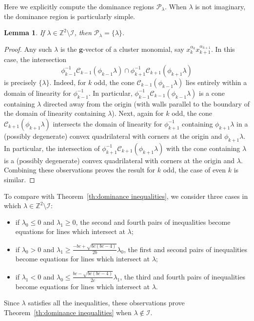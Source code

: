 \documentclass[pdflatex,sn-mathphys]{sn-jnl}%
\theoremstyle{thmstyleone}%
\newtheorem{lemma}[theorem]{Lemma}
\theoremstyle{thmstyletwo}%
\theoremstyle{thmstylethree}%
\newcommand{\bfg}{\boldsymbol{g}}
\newcommand{\cC}{\mathcal{C}}
\newcommand{\cI}{\mathcal{I}}
\newcommand{\cP}{\mathcal{P}}
\newcommand{\ZZ}{\mathbb{Z}}
\begin{document}
  Here we explicitly compute the dominance regions $\cP_\lambda$.
  When $\lambda$ is not imaginary, the dominance region is particularly simple.
  \begin{lemma}
    \label{le:cluster monomials}
    If $\lambda\in\ZZ^2\setminus\cI$, then $\cP_\lambda=\{\lambda\}$.
  \end{lemma}
  \begin{proof}
    Any such $\lambda$ is the $\bfg$-vector of a cluster monomial, say $x_k^{\alpha_k}x_{k+1}^{\alpha_{k+1}}$.
    In this case, the intersection
    \[\phi_{k-1}^{-1}\cC_{k-1}(\phi_{k-1}\lambda) \cap \phi_{k+1}^{-1}\cC_{k+1}(\phi_{k+1}\lambda)\]
    is precisely $\{\lambda\}$. 
    Indeed, for $k$ odd, the cone $\cC_{k-1}(\phi_{k-1}\lambda)$ lies entirely within a domain of linearity for $\phi_{k-1}^{-1}$.
    In particular, $\phi_{k-1}^{-1}\cC_{k-1}(\phi_{k-1}\lambda)$ is a cone containing $\lambda$ directed away from the origin (with walls parallel to the boundary of the domain of linearity containing $\lambda$).
    Next, again for $k$ odd, the cone $\cC_{k+1}(\phi_{k+1}\lambda)$ intersects the domain of linearity for $\phi_{k+1}^{-1}$ containing $\phi_{k+1}\lambda$ in a (possibly degenerate) convex quadrilateral with corners at the origin and $\phi_{k+1}\lambda$.
    In particular, the intersection of $\phi_{k+1}^{-1}\cC_{k+1}(\phi_{k+1}\lambda)$ with the cone containing $\lambda$ is a (possibly degenerate) convex quadrilateral with corners at the origin and $\lambda$.
    Combining these observations proves the result for $k$ odd, the case of even $k$ is similar.
  \end{proof}
  To compare with Theorem~\ref{th:dominance inequalities}, we consider three cases in which $\lambda\in\ZZ^2\setminus\cI$:
  \begin{itemize}
    \item if $\lambda_0 \le 0$ and $\lambda_1 \ge 0$, the second and fourth pairs of inequalities become equations for lines which intersect at $\lambda$;
    \item if $\lambda_0 > 0$ and $\lambda_1 \ge \frac{-bc+\sqrt{bc(bc-4)}}{2b}\lambda_0$, the first and second pairs of inequalities become equations for lines which intersect at $\lambda$;
    \item if $\lambda_1 < 0$ and $\lambda_0 \le \frac{bc-\sqrt{bc(bc-4)}}{2c}\lambda_1$, the third and fourth pairs of inequalities become equations for lines which intersect at $\lambda$.
  \end{itemize}
  Since $\lambda$ satisfies all the inequalities, these observations prove Theorem~\ref{th:dominance inequalities} when $\lambda\notin\cI$.
\end{document}
